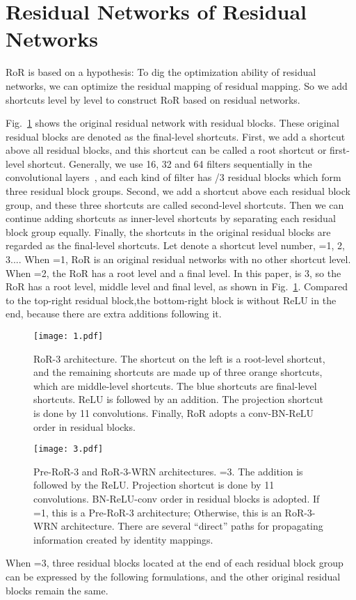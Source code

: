\documentclass[journal]{IEEEtran}
\begin{document}
\section{Residual Networks of Residual Networks}
RoR is based on a hypothesis: To dig the optimization ability of residual networks, we can optimize the residual mapping of residual mapping. So we add shortcuts level by level to construct RoR based on residual networks.
\par 
Fig.~\ref{fig:RoRnetworks} shows the original residual network with  residual blocks. These  original residual blocks are denoted as the final-level shortcuts. First, we add a shortcut above all residual blocks, and this shortcut can be called a root shortcut or first-level shortcut. Generally, we use 16, 32 and 64 filters sequentially in the convolutional layers~\cite{he2015resnets,he2016preresnets}, and each kind of filter has /3 residual blocks which form three residual block groups. Second, we add a shortcut above each residual block group, and these three shortcuts are called second-level shortcuts. Then we can continue adding shortcuts as inner-level shortcuts by separating each residual block group equally. Finally, the shortcuts in the original residual blocks are regarded as the final-level shortcuts. Let  denote a shortcut level number, =1, 2, 3.... When =1, RoR is an original residual networks with no other shortcut level. When =2, the RoR has a root level and a final level. In this paper,  is 3, so the RoR has a root level, middle level and final level, as shown in Fig.~\ref{fig:RoRnetworks}. Compared to the top-right residual block,the bottom-right block is without ReLU in the end, because there are extra additions following it.
\begin{figure}
\centering
\texttt{[image: 1.pdf]}
\caption{RoR-3 architecture. The shortcut on the left is a root-level shortcut, and the remaining shortcuts are made up of three orange shortcuts, which are middle-level shortcuts. The blue shortcuts are final-level shortcuts. ReLU is followed by an addition. The projection shortcut is done by 11 convolutions. Finally, RoR adopts a conv-BN-ReLU order in residual blocks.}
\label{fig:RoRnetworks}
\end{figure}
\begin{figure}
\centering
\texttt{[image: 3.pdf]}
\caption{Pre-RoR-3 and RoR-3-WRN architectures. =3. The addition is followed by the ReLU. Projection shortcut is done by 11 convolutions. BN-ReLU-conv order in residual blocks is adopted. If =1, this is a Pre-RoR-3 architecture; Otherwise, this is an RoR-3-WRN architecture. There are several ``direct'' paths for propagating information created by identity mappings.}
\label{fig:Pre-RoRnetworks}
\end{figure}
\par
When =3, three residual blocks located at the end of each residual block group can be expressed by the following formulations, and the other original residual blocks remain the same. 
\end{document}
